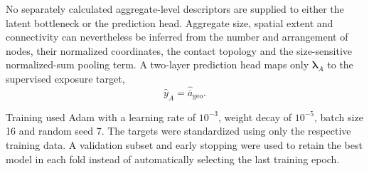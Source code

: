 \documentclass[12pt,a4paper]{article}
\begin{document}
No separately calculated aggregate-level descriptors are supplied to either
the latent bottleneck or the prediction head. Aggregate size, spatial extent
and connectivity can nevertheless be inferred from the number and arrangement
of nodes, their normalized coordinates, the contact topology and the
size-sensitive normalized-sum pooling term. A two-layer prediction head maps
only $\boldsymbol{\lambda}_A$ to the supervised exposure target,
\begin{equation}
	\widehat{y}_A=\widehat{\overline{a}}_{\mathrm{geo}}.
\end{equation}

Training used Adam with a learning rate of $10^{-3}$, weight decay of $10^{-5}$,
batch size 16 and random seed 7. The targets were standardized using only the
respective training data. A validation subset and early stopping were used to
retain the best model in each fold instead of automatically selecting the last
training epoch.
\end{document}
